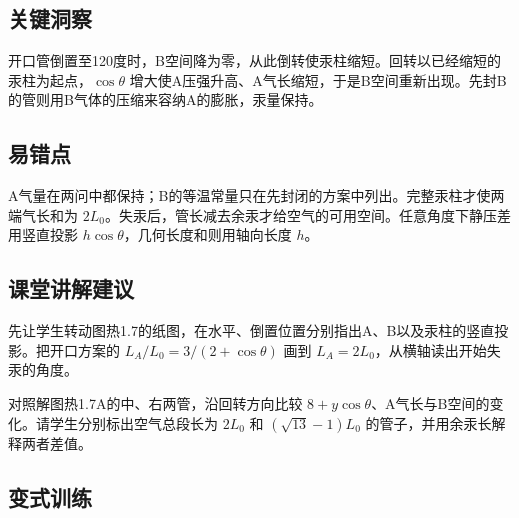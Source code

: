 \documentclass[UTF8,fontset=fandol,a4paper,11pt]{ctexart}
\begin{document}


\subsection*{关键洞察}

开口管倒置至120度时，B空间降为零，从此倒转使汞柱缩短。回转以已经缩短的汞柱为起点，$\cos\theta$ 增大使A压强升高、A气长缩短，于是B空间重新出现。先封B的管则用B气体的压缩来容纳A的膨胀，汞量保持。



\subsection*{易错点}

A气量在两问中都保持；B的等温常量只在先封闭的方案中列出。完整汞柱才使两端气长和为 $2L_0$。失汞后，管长减去余汞才给空气的可用空间。任意角度下静压差用竖直投影 $h\cos\theta$，几何长度和则用轴向长度 $h$。



\subsection*{课堂讲解建议}

先让学生转动图热1.7的纸图，在水平、倒置位置分别指出A、B以及汞柱的竖直投影。把开口方案的 $L_A/L_0=3/(2+\cos\theta)$ 画到 $L_A=2L_0$，从横轴读出开始失汞的角度。

对照解图热1.7A的中、右两管，沿回转方向比较 $8+y\cos\theta$、A气长与B空间的变化。请学生分别标出空气总段长为 $2L_0$ 和 $(\sqrt{13}-1)L_0$ 的管子，并用余汞长解释两者差值。




\subsection*{变式训练}
\end{document}
